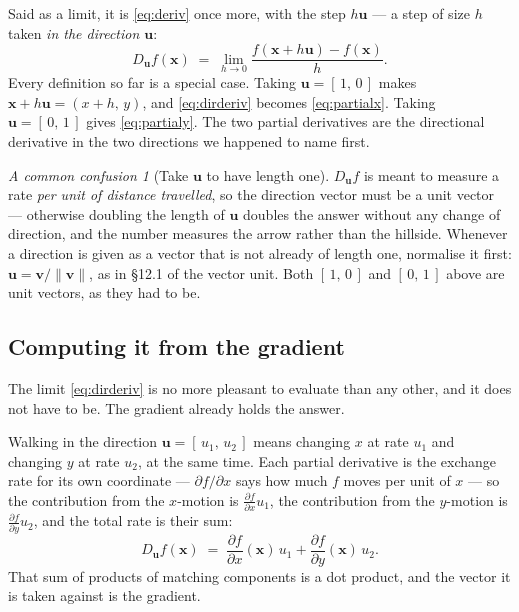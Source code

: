 \documentclass[11pt]{article}
\theoremstyle{plain}
\theoremstyle{definition}
\theoremstyle{remark}
\newtheorem*{warn}{A common confusion}
\newcommand{\vc}[1]{\mathbf{#1}}
\newcommand{\norm}[1]{\lVert #1\rVert}
\newcommand{\pd}[2]{\frac{\partial #1}{\partial #2}}
\begin{document}
\noindent Said as a limit, it is \eqref{eq:deriv} once more, with the step
$h\vc{u}$ --- a step of size $h$ taken \emph{in the direction $\vc{u}$}:
\begin{equation}\label{eq:dirderiv}
  D_{\vc{u}}f(\vc{x})
  \;=\;
  \lim_{h\to0}\frac{f(\vc{x}+h\vc{u})-f(\vc{x})}{h} .
\end{equation}
Every definition so far is a special case. Taking $\vc{u}=[\,1,\,0\,]$ makes
$\vc{x}+h\vc{u}=(x+h,\,y)$, and \eqref{eq:dirderiv} becomes
\eqref{eq:partialx}. Taking $\vc{u}=[\,0,\,1\,]$ gives \eqref{eq:partialy}.
The two partial derivatives are the directional derivative in the two
directions we happened to name first.

\begin{warn}[Take $\vc{u}$ to have length one]
$D_{\vc{u}}f$ is meant to measure a rate \emph{per unit of distance travelled},
so the direction vector must be a unit vector --- otherwise doubling the length
of $\vc{u}$ doubles the answer without any change of direction, and the number
measures the arrow rather than the hillside. Whenever a direction is given as a
vector that is not already of length one, normalise it first:
$\vc{u}=\vc{v}/\norm{\vc{v}}$, as in \S12.1 of the vector unit. Both
$[\,1,\,0\,]$ and $[\,0,\,1\,]$ above are unit vectors, as they had to be.
\end{warn}

\subsection{Computing it from the gradient}
The limit \eqref{eq:dirderiv} is no more pleasant to evaluate than any other, and
it does not have to be. The gradient already holds the answer.

Walking in the direction $\vc{u}=[\,u_1,\,u_2\,]$ means changing $x$ at rate
$u_1$ and changing $y$ at rate $u_2$, at the same time. Each partial derivative
is the exchange rate for its own coordinate --- $\partial f/\partial x$ says how
much $f$ moves per unit of $x$ --- so the contribution from the $x$-motion is
$\pd{f}{x}u_1$, the contribution from the $y$-motion is $\pd{f}{y}u_2$, and the
total rate is their sum:
\[
  D_{\vc{u}}f(\vc{x})
  \;=\; \pd{f}{x}(\vc{x})\,u_1 + \pd{f}{y}(\vc{x})\,u_2 .
\]
That sum of products of matching components is a dot product, and the vector it
is taken against is the gradient.
\end{document}
